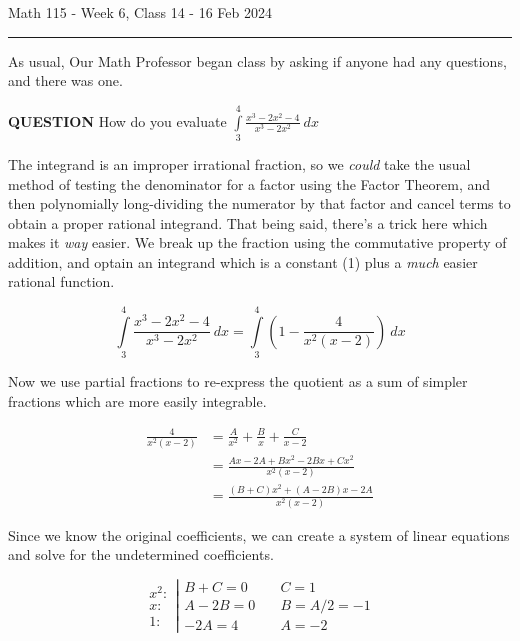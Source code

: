 \documentclass{article}
\begin{document}
Math 115 - Week 6, Class 14 - 16 Feb 2024
\hrule

\vspace{10pt}

As usual, Our Math Professor began class by asking if anyone had any questions, and there was one.

\vspace{10pt}

{\bf{}QUESTION} How do you evaluate $\displaystyle\int\limits_3^4\frac{x^3-2x^2-4}{x^3-2x^2}\ dx$

\vspace{10pt}

The integrand is an improper irrational fraction, so we \textit{could} take the usual method of testing the denominator for a factor using the Factor Theorem, and then polynomially long-dividing the numerator by that factor and cancel terms to obtain a proper rational integrand. That being said, there's a trick here which makes it \textit{way} easier. We break up the fraction using the commutative property of addition, and optain an integrand which is a constant (1) plus a \textit{much} easier rational function.

\[\int\limits_3^4\frac{x^3-2x^2-4}{x^3-2x^2}\ dx=\int\limits_3^4\left(1-\frac{4}{x^2(x-2)}\right)\ dx\]

\vspace{10pt}

Now we use partial fractions to re-express the quotient as a sum of simpler fractions which are more easily integrable.

\begin{align*}
\frac{4}{x^2(x-2)}&=\frac{A}{x^2}+\frac{B}{x}+\frac{C}{x-2}\\
&=\frac{Ax-2A+Bx^2-2Bx+Cx^2}{x^2(x-2)}\\
&=\frac{(B+C)x^2+(A-2B)x-2A}{x^2(x-2)}
\end{align*}

\vspace{10pt}

Since we know the original coefficients, we can create a system of linear equations and solve for the undetermined coefficients.

\[\begin{aligned}x^2:\\x:\\1:\end{aligned}\left|\begin{aligned}B+C=0&\quad C=1\\A-2B=0&\quad B=A/2=-1\\-2A=4&\quad A=-2\end{aligned}\right.\]
\end{document}

